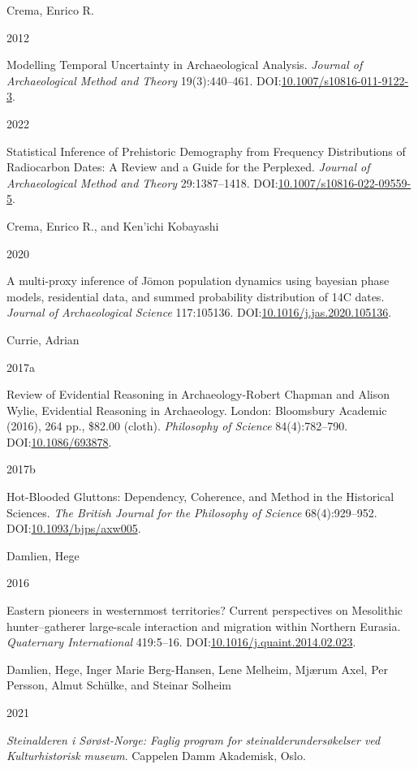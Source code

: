 \documentclass[
  a4paper,
  oneside]{uiophdthesis}
\newlength{\cslhangindent}
\newlength{\csllabelwidth}
\newlength{\cslentryspacingunit} %
\newenvironment{CSLReferences}[2] %
 {%
  \setlength{\parindent}{0pt}
  \ifodd #1
  \let\oldpar\par
  \def\par{\hangindent=\cslhangindent\oldpar}
  \fi
  \setlength{\parskip}{#2\cslentryspacingunit}
 }%
 {}
\newcommand{\CSLBlock}[1]{#1\hfill\break}
\newcommand{\CSLLeftMargin}[1]{\parbox[t]{\csllabelwidth}{#1}}
\newcommand{\CSLRightInline}[1]{\parbox[t]{\linewidth - \csllabelwidth}{#1}\break}
\begin{document}
\begin{CSLReferences}{0}{0}
\leavevmode{}%
\CSLBlock{Crema, Enrico R.}
\CSLLeftMargin{ 2012}
\CSLRightInline{Modelling Temporal Uncertainty in Archaeological Analysis. \emph{Journal of Archaeological Method and Theory} 19(3):440--461. DOI:\href{https://doi.org/10.1007/s10816-011-9122-3}{10.1007/s10816-011-9122-3}.}

\leavevmode{}%
\CSLLeftMargin{ 2022 }
\CSLRightInline{{Statistical Inference of Prehistoric Demography from Frequency Distributions of Radiocarbon Dates: A Review and a Guide for the Perplexed}. \emph{Journal of Archaeological Method and Theory} 29:1387--1418. DOI:\href{https://doi.org/10.1007/s10816-022-09559-5}{10.1007/s10816-022-09559-5}.}

\leavevmode{}%
\CSLBlock{Crema, Enrico R., and Ken'ichi Kobayashi}
\CSLLeftMargin{ 2020}
\CSLRightInline{{A multi-proxy inference of Jōmon population dynamics using bayesian phase models, residential data, and summed probability distribution of 14C dates}. \emph{Journal of Archaeological Science} 117:105136. DOI:\href{https://doi.org/10.1016/j.jas.2020.105136}{10.1016/j.jas.2020.105136}.}

\leavevmode{}%
\CSLBlock{Currie, Adrian}
\CSLLeftMargin{ 2017a}
\CSLRightInline{{Review of Evidential Reasoning in Archaeology-Robert Chapman and Alison Wylie, Evidential Reasoning in Archaeology. London: Bloomsbury Academic (2016), 264 pp., \$82.00 (cloth)}. \emph{Philosophy of Science} 84(4):782--790. DOI:\href{https://doi.org/10.1086/693878}{10.1086/693878}.}

\leavevmode{}%
\CSLLeftMargin{ 2017b }
\CSLRightInline{{Hot-Blooded Gluttons: Dependency, Coherence, and Method in the Historical Sciences}. \emph{The British Journal for the Philosophy of Science} 68(4):929--952. DOI:\href{https://doi.org/10.1093/bjps/axw005}{10.1093/bjps/axw005}.}

\leavevmode{}%
\CSLBlock{Damlien, Hege}
\CSLLeftMargin{ 2016}
\CSLRightInline{{Eastern pioneers in westernmost territories? Current perspectives on Mesolithic hunter--gatherer large-scale interaction and migration within Northern Eurasia}. \emph{Quaternary International} 419:5--16. DOI:\href{https://doi.org/10.1016/j.quaint.2014.02.023}{10.1016/j.quaint.2014.02.023}.}

\leavevmode{}%
\CSLBlock{Damlien, Hege, Inger Marie Berg-Hansen, Lene Melheim, Mjærum Axel, Per Persson, Almut Schülke, and Steinar Solheim}
\CSLLeftMargin{ 2021}
\CSLRightInline{\emph{{Steinalderen i Sørøst-Norge: Faglig program for steinalderundersøkelser ved Kulturhistorisk museum}}. Cappelen Damm Akademisk, Oslo.}


\end{CSLReferences}
\end{document}
